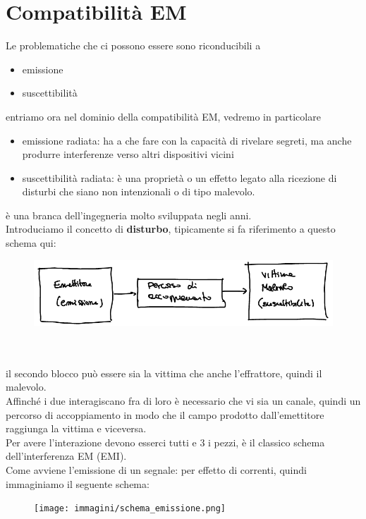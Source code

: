\documentclass[oneside, 12pt]{extbook}
\begin{document}
\section{Compatibilità EM}
Le problematiche che ci possono essere sono riconducibili a  
\begin{itemize}
	\item emissione
	\item suscettibilità 
\end{itemize}
entriamo ora nel dominio della compatibilità EM, vedremo in particolare
\begin{itemize}
	\item emissione radiata: ha a che fare con la capacità di rivelare segreti, ma anche produrre interferenze verso altri dispositivi vicini
	\item suscettibilità radiata: è una proprietà o un effetto legato alla ricezione di disturbi che siano non intenzionali o di tipo malevolo.
\end{itemize}
è una branca dell'ingegneria molto sviluppata negli anni.\\Introduciamo il concetto di \textbf{disturbo}, tipicamente si fa riferimento a questo schema qui:\\
\begin{figure}[!h]
	\includegraphics[scale=0.3]{immagini/schema_distrurbo.png}
\end{figure}\\\\
il secondo blocco può essere sia la vittima che anche l'effrattore, quindi il malevolo.\\Affinché i due interagiscano fra di loro è necessario che vi sia un canale, quindi un percorso di accoppiamento in modo che il campo prodotto dall'emettitore raggiunga la vittima e viceversa.\\ Per avere l'interazione devono esserci tutti e 3 i pezzi, è il classico schema dell'interferenza EM (EMI).\\Come avviene l'emissione di un segnale: per effetto di correnti, quindi immaginiamo il seguente schema:\\ 
\begin{figure}[!h]
	\texttt{[image: immagini/schema\_emissione.png]}
\end{figure}
\end{document}
